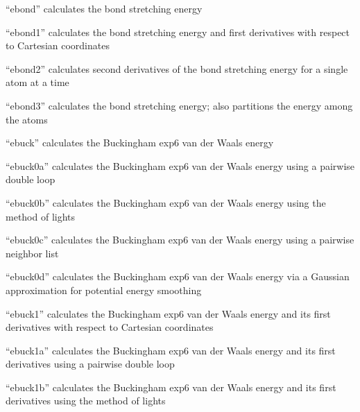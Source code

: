 \documentclass[letterpaper,11pt,english]{sphinxmanual}
\begin{document}
“ebond” calculates the bond stretching energy


“ebond1” calculates the bond stretching energy and
first derivatives with respect to Cartesian coordinates


“ebond2” calculates second derivatives of the bond
stretching energy for a single atom at a time


“ebond3” calculates the bond stretching energy; also
partitions the energy among the atoms


“ebuck” calculates the Buckingham exp\sphinxhyphen{}6 van der Waals energy


“ebuck0a” calculates the Buckingham exp\sphinxhyphen{}6 van der Waals energy
using a pairwise double loop


“ebuck0b” calculates the Buckingham exp\sphinxhyphen{}6 van der Waals energy
using the method of lights


“ebuck0c” calculates the Buckingham exp\sphinxhyphen{}6 van der Waals energy
using a pairwise neighbor list


“ebuck0d” calculates the Buckingham exp\sphinxhyphen{}6 van der Waals energy
via a Gaussian approximation for potential energy smoothing


“ebuck1” calculates the Buckingham exp\sphinxhyphen{}6 van der Waals energy
and its first derivatives with respect to Cartesian coordinates


“ebuck1a” calculates the Buckingham exp\sphinxhyphen{}6 van der Waals energy
and its first derivatives using a pairwise double loop


“ebuck1b” calculates the Buckingham exp\sphinxhyphen{}6 van der Waals energy
and its first derivatives using the method of lights
\end{document}

